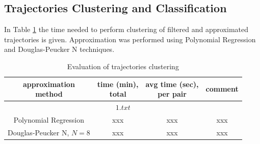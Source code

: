 \subsection{Trajectories Clustering and Classification}

In Table \ref{table:clust_time} the time needed to perform clustering of filtered and approximated trajectories is given. Approximation was performed using Polynomial Regression and Douglas-Peucker N techniques.

\begin{table}[!htb]
	\caption{Evaluation of trajectories clustering}
	\label{table:clust_time}
	
	\setlength{\tabcolsep}{10pt}
	\centering
	\setcellgapes{3pt}\makegapedcells
	
	\begin{tabular}{||c|c|c|c||}
		\hline
		\makecell{approximation\\method} & \makecell{time (min),\\total} & \makecell{avg time (sec),\\per pair} & comment \\[0.5ex]
		\hline
		\multicolumn{4}{||c||}{$1.txt$} \\[0.5ex]
		\hline
		Polynomial Regression 	& xxx 	& xxx	& xxx \\[0.5ex]
		\hline
		Douglas-Peucker N, $N = 8$ 	& xxx 	& xxx	& xxx \\[0.5ex]
		
		
		\hline
	\end{tabular}
\end{table}

